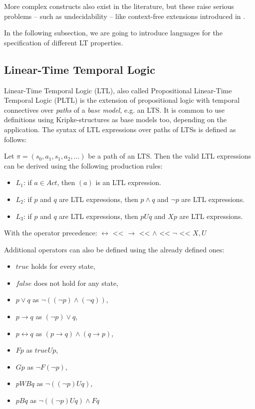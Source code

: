 More complex constructs also exist in the literature, but these raise serious problems -- such as undecidability -- like context-free extensions introduced in \cite{temporallogics}. 
	
In the following subsection, we are going to introduce languages for the specification of different LT properties.


\subsection{Linear-Time Temporal Logic}
Linear-Time Temporal Logic (LTL), also called Propositional Linear-Time Temporal Logic (PLTL) is the extension of propositional logic with temporal connectives over \textit{paths} of a \textit{base model}, e.g. an LTS. It is common to use definitions using Kripke-structures \cite{Kripke1963-KRISCO} as base models too, depending on the application. The syntax of LTL expressions over paths of LTSs is defined as follows:

\begin{definition}
	Let $\pi = (s_0, a_1, s_1, a_2, ... )$ be a path of an LTS. Then the valid LTL expressions can be derived using the following production rules:
	\begin{itemize}
		\item $L_1$: if $a \in Act$, then $(a)$ is an LTL expression. 
		\item $L_2$: if $p$ and $q$ are LTL expressions, then $p \land q$ and $\neg p$ are LTL expressions.
		\item $L_3$: if $p$ and $q$ are LTL expressions, then $p U q$ and $X p$ are LTL expressions.
	\end{itemize}
	With the operator precedence: $\leftrightarrow$  <<  $\rightarrow$  << $\land$  <<  $\neg$  <<  $X, U$
\end{definition}

Additional operators can also be defined using the already defined ones:
\begin{itemize}
	\setlength\itemsep{0.2em}
	\item $true$ holds for every state,
	\item $false$ does not hold for any state,  
	\item $p \lor q$ as $\neg((\neg p) \land (\neg q))$,
	\item $p \rightarrow q$ as $(\neg p) \lor q$,
	\item $p \leftrightarrow q$ as $(p \rightarrow q) \land (q \rightarrow p)$,
	\item $F p$ as $true U p$,
	\item $G p$ as $\neg F(\neg p)$,
	\item $p WB q$ as $\neg((\neg p) U q)$,
	\item $p B q$ as $\neg((\neg p) U q) \land F q$
\end{itemize}

